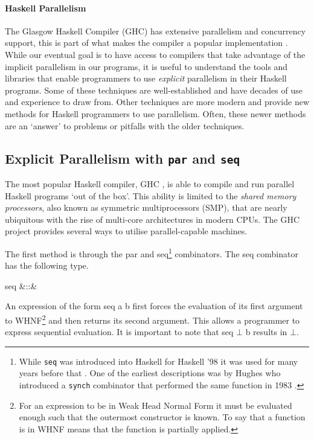 \paragraph{Haskell Parallelism}

The Glasgow Haskell Compiler (GHC) has extensive parallelism and concurrency
support, this is part of what makes the compiler a popular implementation
\citep{HistoryOfHaskell}. While our eventual goal is to have access to
compilers that take advantage of the implicit parallelism in our programs, it
is useful to understand the tools and libraries that enable programmers to use
\emph{explicit} parallelism in their Haskell programs. Some of these techniques
are well-established and have decades of use and experience to draw from. Other
techniques are more modern and provide new methods for Haskell programmers to
use parallelism. Often, these newer methods are an `answer' to problems or
pitfalls with the older techniques.

\subsection{Explicit Parallelism with \texttt{par} and \texttt{seq}}
\label{sec:parAndSeq}

The most popular Haskell compiler, GHC \citep{HistoryOfHaskell}, is able to
compile and run parallel Haskell programs `out of the box'. This ability is
limited to the \emph{shared memory processors}, also known as symmetric
multiprocessors (SMP), that are nearly ubiquitous with the rise of multi-core
architectures in modern CPUs. The GHC project provides several ways to utilise
parallel-capable machines.

The first method is through the \<par\> and \<seq\>\footnote{While
\texttt{seq} was introduced into Haskell for Haskell '98 \citep{Haskell98Book}
it was used for many years before that \citep{HistoryOfHaskell}. One of the
earliest descriptions was by Hughes who introduced a \texttt{synch} combinator
that performed the same function in 1983 \citep{hughes:thesis}.} combinators.
The \<seq\> combinator has the following type.

\begin{haskell}
seq &::& \hasalpha \to \hasbeta \to \hasbeta
\end{haskell}

An expression of the form \<seq a b\> first forces the evaluation of its
first argument to WHNF\footnote{For an expression to be in Weak Head Normal
Form it must be evaluated enough such that the outermost constructor is known.
To say that a function is in WHNF means that the function is partially
applied.} and then returns its second argument. This allows a programmer to
express sequential evaluation. It is important to note that \<seq\> $\bot$
\<b\> results in $\bot$.

